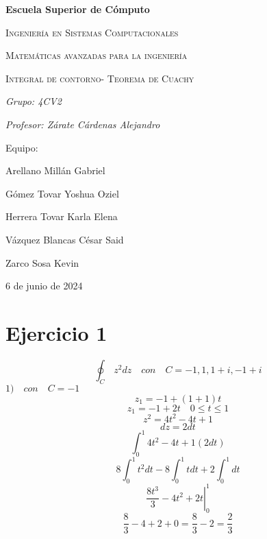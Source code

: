 \documentclass{article}
\begin{document}
\begin{titlepage}
\centering
{\bfseries\LARGE Escuela Superior de Cómputo \par}
\vspace{1cm}
{\scshape\Large Ingeniería en Sistemas Computacionales \par}
\vspace{3cm}
{\scshape\Huge Matemáticas avanzadas para la ingeniería \par}
\vspace{1cm}
{\Large \textsc{Integral de contorno- Teorema de Cuachy} \par}
\vspace{3cm}
{\itshape\Large Grupo: 4CV2 \par}
{\itshape\Large Profesor: Zárate Cárdenas Alejandro \par}
\vfill
{\Large Equipo: \par}
{\Large Arellano Millán Gabriel \par}
{\Large Gómez Tovar Yoshua Oziel \par}
{\Large Herrera Tovar Karla Elena \par}
{\Large Vázquez Blancas César Said \par}
{\Large Zarco Sosa Kevin \par}
\vfill
{\Large 6 de junio de 2024 \par}
\end{titlepage}
\section{Ejercicio 1}
\[
\oint_{C}  \, z^2dz \quad con \quad C=-1,1,1+i,-1+i
\]
\(1)\quad con \quad C= -1 \) 
\begin{equation}
z_1=-1+(1+1)t
\end{equation}
\begin{equation}
z_1=-1+2t \quad 0\leq t \leq 1
\end{equation}
\begin{equation}
z^2=4t^2-4t+1
\end{equation}
\begin{equation}
dz=2dt
\end{equation}
\begin{equation}
\int_{0}^{1} 4t^2-4t+1(2dt)
\end{equation}
\begin{equation}
8\int_{0}^{1} t^2dt -8\int_{0}^{1} tdt + 2\int_{0}^{1}dt
\end{equation}
\begin{equation}
\left.\frac{8t^3}{3}-4t^2+2t \right|_{0}^{1}
\end{equation}
\begin{equation}
\frac{8}{3}-4+2+0= \frac{8}{3}-2=\frac{2}{3}
\end{equation}
\end{document}
